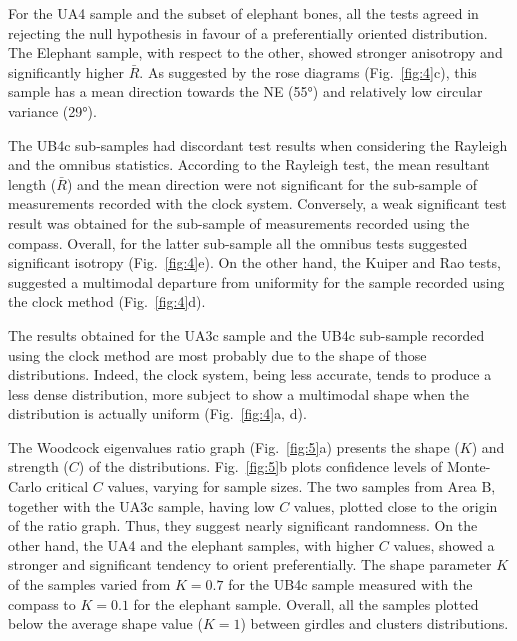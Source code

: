 \documentclass[review,authoryear,times]{elsarticle} %
\begin{document}
For the UA4 sample and the subset of elephant bones, all the tests agreed in rejecting the null hypothesis in favour of a preferentially oriented distribution. The Elephant sample, with respect to the other, showed stronger anisotropy and significantly higher $\bar{R}$. As suggested by the rose diagrams (Fig.~\ref{fig:4}c), this sample has a mean direction towards the NE (55°) and relatively low circular variance (29°).

The UB4c sub-samples had discordant test results when considering the Rayleigh and the omnibus statistics. According to the Rayleigh test, the mean resultant length ($\bar{R}$) and the mean direction were not significant for the sub-sample of measurements recorded with the clock system. Conversely, a weak significant test result was obtained for the sub-sample of measurements recorded using the compass. Overall, for the latter sub-sample all the omnibus tests suggested significant isotropy (Fig.~\ref{fig:4}e). On the other hand, the Kuiper and Rao tests, suggested a multimodal departure from uniformity for the sample recorded using the clock method (Fig.~\ref{fig:4}d).

The results obtained for the UA3c sample and the UB4c sub-sample recorded using the clock method are most probably due to the shape of those distributions. Indeed, the clock system, being less accurate, tends to produce a less dense distribution, more subject to show a multimodal shape when the distribution is actually uniform (Fig.~\ref{fig:4}a, d).

The Woodcock eigenvalues ratio graph (Fig.~\ref{fig:5}a) presents the shape ($K$) and strength ($C$) of the distributions. Fig.~\ref{fig:5}b plots confidence levels of Monte-Carlo critical $C$ values, varying for sample sizes. The two samples from Area B, together with the UA3c sample, having low $C$ values, plotted close to the origin of the ratio graph. Thus, they suggest nearly significant randomness. On the other hand, the UA4 and the elephant samples, with higher $C$ values, showed a stronger and significant tendency to orient preferentially. The shape parameter $K$ of the samples varied from $K=0.7$ for the UB4c sample measured with the compass to $K=0.1$ for the elephant sample. Overall, all the samples plotted below the average shape value ($K=1$) between girdles and clusters distributions.
\end{document}
